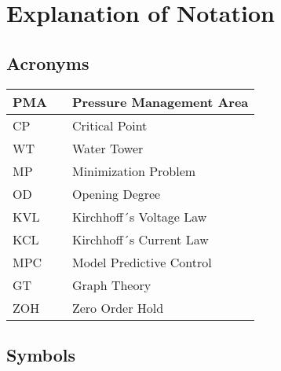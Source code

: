 \chapter{Explanation of Notation}

\section*{Acronyms}
	
	\begin{tabular}{|l c l|} \hline
		PMA 		&&	Pressure Management Area		\\ \hline
		CP			&&	Critical Point					\\ \hline
		WT			&&	Water Tower						\\ \hline
		MP		  	&&	Minimization Problem			\\ \hline
		OD 			&&  Opening Degree					\\ \hline
		KVL 		&&  Kirchhoff´s Voltage Law 		\\ \hline
		KCL 		&&  Kirchhoff´s Current Law			\\ \hline
		MPC			&&  Model Predictive Control		\\ \hline
		GT			&&  Graph Theory					\\ \hline
		ZOH			&&  Zero Order Hold					\\ \hline
	\end{tabular}

\section*{Symbols}


